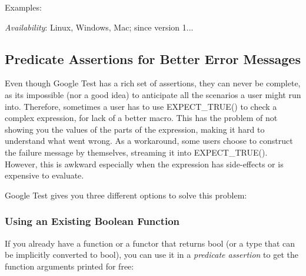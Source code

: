 Examples\+:


\begin{DoxyCode}{0}
\DoxyCodeLine{}
\DoxyCodeLine{\});}
\end{DoxyCode}


{\itshape Availability}\+: Linux, Windows, Mac; since version 1...

\subsection*{Predicate Assertions for Better Error Messages}

Even though Google Test has a rich set of assertions, they can never be complete, as it\textquotesingle{}s impossible (nor a good idea) to anticipate all the scenarios a user might run into. Therefore, sometimes a user has to use {\ttfamily E\+X\+P\+E\+C\+T\+\_\+\+T\+R\+U\+E()} to check a complex expression, for lack of a better macro. This has the problem of not showing you the values of the parts of the expression, making it hard to understand what went wrong. As a workaround, some users choose to construct the failure message by themselves, streaming it into {\ttfamily E\+X\+P\+E\+C\+T\+\_\+\+T\+R\+U\+E()}. However, this is awkward especially when the expression has side-\/effects or is expensive to evaluate.

Google Test gives you three different options to solve this problem\+:

\subsubsection*{Using an Existing Boolean Function}

If you already have a function or a functor that returns {\ttfamily bool} (or a type that can be implicitly converted to {\ttfamily bool}), you can use it in a {\itshape predicate assertion} to get the function arguments printed for free\+:

